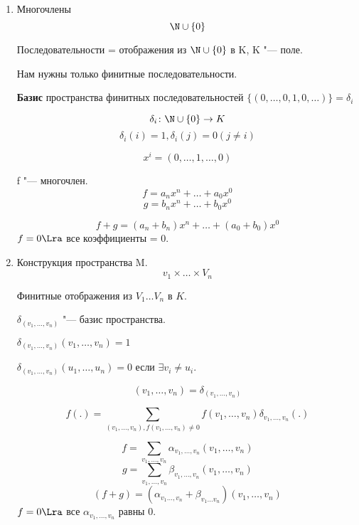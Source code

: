\begin{exmp}
	\begin{enumerate}
	\item Многочлены
	 $$\N \cup \{0\}$$

	 Последовательности = отображения из $\N \cup \{0\}$ в K, K "--- поле.

	 Нам нужны только финитные последовательности.

	 \textbf{Базис} пространства финитных последовательностей $\{(0,\dots, 0, 1, 0, \dots)\} = \delta_i$

	 $$\delta_i\colon \N\cup\{0\} \to K$$
	 $$\delta_i(i) = 1, \delta_i(j) = 0(j \ne i)$$

	 $$x^i = (0, \dots, 1, \dots, 0)$$

	 f "--- многочлен.
	 $$f = a_nx^n + \dots + a_0x^0$$
	 $$g = b_nx^n + \dots + b_0x^0$$

	 $$f + g = (a_n + b_n)x^n + \dots +(a_0 + b_0)x^0$$
	 $f = 0 \Lra$ все коэффициенты = 0.

	\item Конструкция пространства M.
	$$v_1 \times \dots \times V_n$$

	Финитные отображения из $V_1 \dots V_n$ в $K$.

	$\delta_{(v_1, \dots, v_n)}$ "--- базис пространства.

	$\delta_{(v_1, \dots, v_n)}(v_1, \dots, v_n) = 1$

	$\delta_{(v_1, \dots, v_n)}(u_1, \dots, u_n) = 0$ если $\exists v_i \ne u_i$.

	$$(v_1, \dots, v_n) = \delta_{(v_1, \dots, v_n)}$$

	$$f(.) = \sum_{(v_1, \dots, v_n), f(v_1, \dots, v_n) \ne 0} f(v_1, \dots, v_n)\delta_{v_1, \dots, v_n}(.)$$

	$$f = \sum_{v_1, \dots, v_n}\alpha_{v_1, \dots, v_n}(v_1, \dots, v_n)$$
	$$g = \sum_{v_1, \dots, v_n}\beta_{v_1, \dots, v_n}(v_1, \dots, v_n)$$
	$$(f + g) = (\alpha_{v_1 \dots, v_n} + \beta_{v_1 \dots v_n})(v_1, \dots, v_n)$$
	$f = 0 \Lra$  все $\alpha_{v_1, \dots, v_n}$  равны 0.
	\end{enumerate}
\end{exmp}
